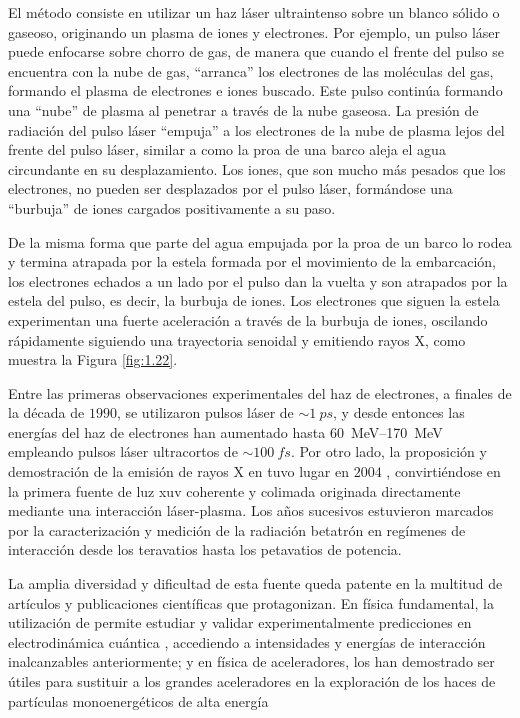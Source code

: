 El método consiste en utilizar un haz láser ultraintenso sobre un blanco sólido o gaseoso, originando un plasma de iones y electrones. Por ejemplo, un pulso láser puede enfocarse sobre chorro de gas, de manera que cuando el frente del pulso se encuentra con la nube de gas, \enquote{arranca} los electrones de las moléculas del gas, formando el plasma de electrones e iones buscado. Este pulso continúa formando una \enquote{nube} de plasma al penetrar a través de la nube gaseosa. La presión de radiación del pulso láser \enquote{empuja} a los electrones de la nube de plasma lejos del frente del pulso láser, similar a como la proa de una barco aleja el agua circundante en su desplazamiento. Los iones, que son mucho más pesados que los electrones, no pueden ser desplazados por el pulso láser, formándose una \enquote{burbuja} de iones cargados positivamente a su paso.

De la misma forma que parte del agua empujada por la proa de un barco lo rodea y termina atrapada por la estela formada por el movimiento de la embarcación, los electrones echados a un lado por el pulso dan la vuelta y son atrapados por la estela del pulso, es decir, la burbuja de iones. Los electrones que siguen la estela experimentan una fuerte aceleración a través de la burbuja de iones, oscilando rápidamente siguiendo una trayectoria senoidal y emitiendo rayos X, como muestra la Figura \ref{fig:1.22}.

Entre las primeras observaciones experimentales del haz de electrones, a finales de la década de $1990$, \autocite{Modena1995,Umstadter1996} se utilizaron pulsos láser de $\sim \qty{1}{ps}$, y desde entonces las energías del haz de electrones han aumentado hasta \qtyrange{60}{170}{MeV} \autocite{Mangles2004,Faure2004,Geddes2004} empleando pulsos láser ultracortos de $\sim \qty{100}{fs}$. Por otro lado, la proposición y demostración de la emisión de rayos X en  tuvo lugar en $2004$ \autocite{Kostyukov2004,Rousse2004}, convirtiéndose en la primera fuente de luz \acrshort{xuv} coherente y colimada originada directamente mediante una interacción láser-plasma. Los años sucesivos estuvieron marcados por la caracterización y medición de la radiación betatrón en regímenes de interacción desde los teravatios \autocite{TaPhuoc2005,TaPhuoc2007,TaPhuoc2012,Shah2006,Albert2008} hasta los petavatios \autocite{Kneip2008,Kneip2010} de potencia. 

La amplia diversidad y dificultad de esta fuente queda patente en la multitud de artículos y publicaciones científicas que protagonizan. En física fundamental, la utilización de  permite estudiar y validar experimentalmente predicciones en electrodinámica cuántica \autocite{Cole2018,Poder2018}, accediendo a intensidades y energías de interacción inalcanzables anteriormente; y en física de aceleradores, los  han demostrado ser útiles para sustituir a los grandes aceleradores en la exploración de los haces de partículas monoenergéticos de alta energía \autocite{Gotzfried2020,Gilljohann2019} 

